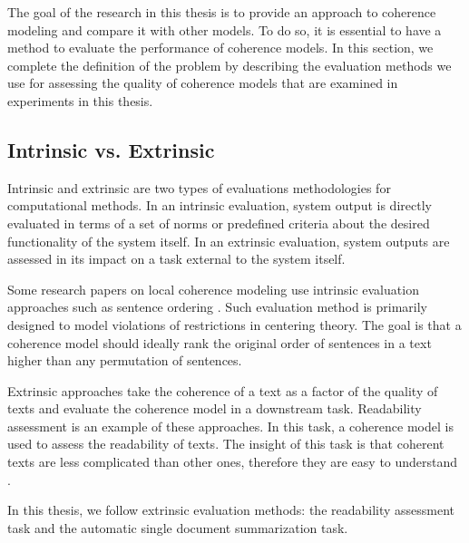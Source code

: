 The goal of the research in this thesis is to provide an approach to coherence modeling and compare it with other models. 
To do so, it is essential to have a method to evaluate the performance of coherence models. 
In this section, we complete the definition of the problem by describing the evaluation methods we use for assessing the quality of coherence models that are examined in experiments in this thesis.  

\subsection{Intrinsic vs. Extrinsic}

Intrinsic and extrinsic are two types of evaluations methodologies for computational methods.  
In an intrinsic evaluation, system output is directly evaluated in terms of a set of norms or predefined criteria about the desired functionality of the system itself. 
In an extrinsic evaluation, system outputs are assessed in its impact on a task external to the system itself. 

Some research papers on local coherence modeling use intrinsic evaluation approaches such as sentence ordering \cite{karamanis04a,barzilay04}. 
Such evaluation method \cite{karamanis04a} is primarily designed to model violations of restrictions in centering theory. 
The goal is that a coherence model should ideally rank the original order of sentences in a text higher than any permutation of sentences. 

Extrinsic approaches take the coherence of a text as a factor of the quality of texts and evaluate the coherence model in a downstream task. 
Readability assessment \cite{pitler08} is an example of these approaches. 
In this task, a coherence model is used to assess the readability of texts.
The insight of this task is that coherent texts are less complicated than other ones, therefore they are easy to understand \cite{pitler08}. 

In this thesis, we follow extrinsic evaluation methods: the readability assessment task and the automatic single document summarization task.  

